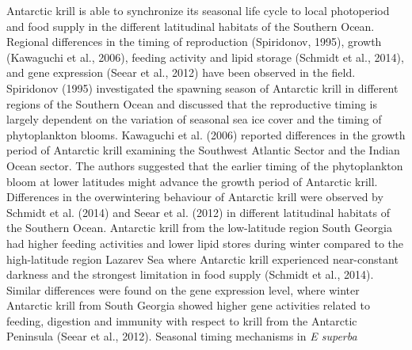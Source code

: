 Antarctic krill is able to synchronize its seasonal life cycle to local photoperiod and food supply in the different latitudinal habitats of the Southern Ocean. Regional differences in the timing of reproduction (Spiridonov, 1995), growth (Kawaguchi et al., 2006), feeding activity and lipid storage (Schmidt et al., 2014), and gene expression (Seear et al., 2012) have been observed in the field. Spiridonov (1995) investigated the spawning season of Antarctic krill in different regions of the Southern Ocean and discussed that the reproductive timing is largely dependent on the variation of  seasonal sea ice cover and the timing of phytoplankton blooms. 
Kawaguchi et al. (2006) reported differences in the growth period of Antarctic krill examining the Southwest Atlantic Sector and the Indian Ocean sector. The authors suggested that the earlier timing of the phytoplankton bloom at lower latitudes might advance the growth period of Antarctic krill. Differences in the overwintering behaviour of Antarctic krill were observed by Schmidt et al. (2014) and Seear et al. (2012) in different latitudinal habitats of the Southern Ocean. Antarctic krill from the low-latitude region South Georgia had higher feeding activities and lower lipid stores during winter compared to the high-latitude region Lazarev Sea where Antarctic krill experienced near-constant darkness and the strongest limitation in food supply (Schmidt et al., 2014). Similar differences were found on the gene expression level, where winter Antarctic krill from South Georgia showed higher gene activities related to feeding, digestion and immunity with respect to krill from the Antarctic Peninsula (Seear et al., 2012).
Seasonal timing mechanisms in \textit{E superba}
\
